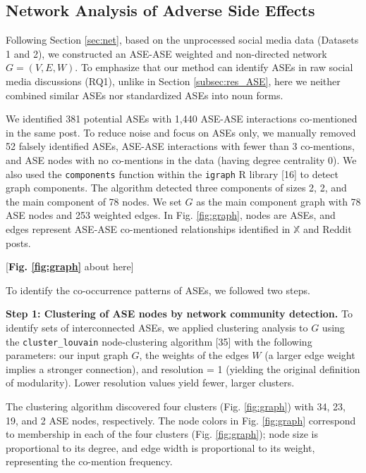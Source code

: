 \documentclass[referee,bst/sn-basic]{sn-jnl}%
\begin{document}
\subsection{Network Analysis of Adverse Side Effects}
\label{subsec:ASE_net}
Following Section \ref{sec:net}, based on the unprocessed social media data (Datasets 1 and 2), we constructed an ASE-ASE weighted and non-directed network $G=(V,E,W)$.
To emphasize that our method can identify ASEs in raw social media discussions (RQ1), unlike in Section \ref{subsec:res_ASE}, here we neither combined similar ASEs nor standardized ASEs into noun forms.

We identified 381 potential ASEs with 1,440 ASE-ASE interactions co-mentioned in the same post. 
To reduce noise and focus on ASEs only, we manually removed 52 falsely identified ASEs, ASE-ASE interactions with fewer than 3 co-mentions, and ASE nodes with no co-mentions in the data (having degree centrality 0). 
We also used the \texttt{components} function within the \texttt{igraph} R library [16] 
to detect graph components.
The algorithm detected three components of sizes 2, 2, and the main component of 78 nodes.
We set $G$ as the main component graph with 78 ASE nodes and 253 weighted edges.
In Fig. \ref{fig:graph}, nodes are ASEs, and edges represent ASE-ASE co-mentioned relationships identified in $\mathbb{X}$ and Reddit posts.  

\begin{center}
    [\textbf{Fig. \ref{fig:graph}} about here]
\end{center}

To identify the co-occurrence patterns of ASEs, we followed two steps.

\textbf{Step 1: Clustering of ASE nodes by network community detection.}
To identify sets of interconnected ASEs, we applied clustering analysis to $G$ using the \texttt{cluster\_louvain} node-clustering algorithm [35] 
with the following parameters: our input graph $G$, the weights of the edges $W$ (a larger edge weight implies a stronger connection), and resolution = 1 (yielding the original definition of modularity).
Lower resolution values yield fewer, larger clusters.

The clustering algorithm discovered four clusters (Fig. \ref{fig:graph}) with 34, 23, 19, and 2 ASE nodes, respectively.
The node colors in Fig. \ref{fig:graph} correspond to membership in each of the four clusters  (Fig. \ref{fig:graph}); node size is proportional to its degree, and edge width is proportional to its weight, representing the co-mention frequency.
\end{document}
